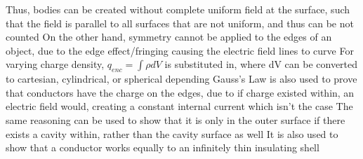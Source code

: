 \documentclass[11 pt, twoside]{article}
\newenvironment{outline*}
{
	\begin{outline}[enumerate]
	}
	{\end{outline}
}
\begin{document}
\begin{outline*}
\2 Thus, bodies can be created without complete uniform field at the surface, such that the field is parallel to all surfaces that are not uniform, and thus can be not counted
\2 On the other hand, symmetry cannot be applied to the edges of an object, due to the edge effect/fringing causing the electric field lines to curve
\1 For varying charge density, $q_{enc} = \int \rho dV$ is substituted in, where dV can be converted to cartesian, cylindrical, or spherical depending
\1 Gauss's Law is also used to prove that conductors have the charge on the edges, due to if charge existed within, an electric field would, creating a constant internal current which isn't the case
\2 The same reasoning can be used to show that it is only in the outer surface if there exists a cavity within, rather than the cavity surface as well
\2 It is also used to show that a conductor works equally to an infinitely thin insulating shell
\end{outline*}
\end{document}

